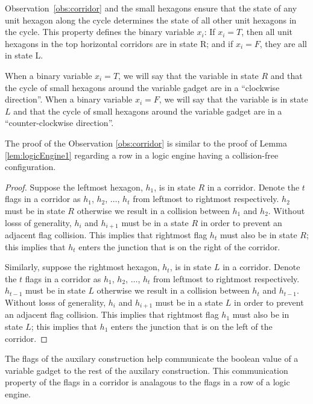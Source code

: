 Observation~\ref{obs:corridor} and the small hexagons ensure that the state of any unit hexagon along the cycle determines the state of all other unit hexagons in the cycle. 
This property defines the binary variable $x_i$: If $x_i=T$, then all unit hexagons in the top horizontal corridors are in state R; and if $x_i=F$, they are all in state L.

When a binary variable $x_i = T$, we will say that the variable in state $R$ and that the cycle of small hexagons around the variable gadget are in a ``clockwise direction''.
When a binary variable $x_i = F$, we will say that the variable is in state $L$ and that the cycle of small hexagons around the variable gadget are in a ``counter-clockwise direction''. 

The proof of the Observation \ref{obs:corridor} is similar to the proof of Lemma \ref{lem:logicEngine1} regarding a row in a logic engine having a collision-free configuration.
\begin{proof}
Suppose the leftmost hexagon, $h_1$, is in state $R$ in a corridor.
Denote the $t$ flags in a corridor as $h_1$, $h_2$, $\ldots$, $h_t$ from leftmost to rightmost respectively.
$h_2$ must be in state $R$ otherwise we result in a collision between $h_1$ and $h_2$.
Without losss of generality, $h_i$ and $h_{i+1}$ must be in a state $R$ in order to prevent an adjacent flag collision. 
This implies that rightmost flag $h_t$ must also be in state $R$; this implies that $h_t$ enters the junction that is on the right of the corridor.

Similarly, suppose the rightmost hexagon, $h_t$, is in state $L$ in a corridor.
Denote the $t$ flags in a corridor as $h_1$, $h_2$, $\ldots$, $h_t$ from leftmost to rightmost respectively.
$h_{t-1}$ must be in state $L$ otherwise we result in a collision between $h_t$ and $h_{t-1}$.
Without losss of generality, $h_i$ and $h_{i+1}$ must be in a state $L$ in order to prevent an adjacent flag collision. 
This implies that rightmost flag $h_1$ must also be in state $L$; this implies that $h_1$ enters the junction that is on the left of the corridor.
\end{proof}
The flags of the auxilary construction help communicate the boolean value of a variable gadget to the rest of the auxilary construction.
This communication property of the flags in a corridor is analagous to the flags in a row of a logic engine.

